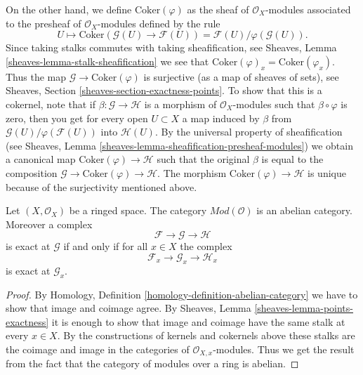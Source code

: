 \medskip\noindent
On the other hand, we define
$\text{Coker}(\varphi)$ as the sheaf of $\mathcal{O}_X$-modules
associated to the presheaf of $\mathcal{O}_X$-modules defined
by the rule
$$
U
\longmapsto
\text{Coker}(\mathcal{G}(U)\to \mathcal{F}(U)) =
\mathcal{F}(U)/\varphi(\mathcal{G}(U)).
$$
Since taking stalks commutes with taking sheafification, see
Sheaves, Lemma \ref{sheaves-lemma-stalk-sheafification} we
see that $\text{Coker}(\varphi)_x = \text{Coker}(\varphi_x)$.
Thus the map $\mathcal{G} \to \text{Coker}(\varphi)$ is surjective
(as a map of sheaves of sets),
see Sheaves, Section \ref{sheaves-section-exactness-points}.
To show that this is a cokernel, note that if
$\beta : \mathcal{G} \to \mathcal{H}$ is a morphism of $\mathcal{O}_X$-modules
such that $\beta \circ \varphi$ is zero, then you get for every
open $U \subset X$ a map induced by $\beta$ from
$\mathcal{G}(U)/\varphi(\mathcal{F}(U))$ into $\mathcal{H}(U)$.
By the universal property of sheafification (see
Sheaves, Lemma \ref{sheaves-lemma-sheafification-presheaf-modules})
we obtain a canonical map $\text{Coker}(\varphi) \to \mathcal{H}$
such that the original $\beta$ is equal to
the composition
$\mathcal{G} \to \text{Coker}(\varphi) \to \mathcal{H}$.
The morphism $\text{Coker}(\varphi) \to \mathcal{H}$ is unique
because of the surjectivity mentioned above.

\begin{lemma}
\label{lemma-abelian}
Let $(X, \mathcal{O}_X)$ be a ringed space. The category
$\textit{Mod}(\mathcal{O})$ is an abelian category. Moreover
a complex
$$
\mathcal{F} \to \mathcal{G} \to \mathcal{H}
$$
is exact at $\mathcal{G}$ if and only if for all $x \in X$ the
complex
$$
\mathcal{F}_x \to \mathcal{G}_x \to \mathcal{H}_x
$$
is exact at $\mathcal{G}_x$.
\end{lemma}

\begin{proof}
By Homology, Definition \ref{homology-definition-abelian-category}
we have to show that image and coimage agree. By Sheaves,
Lemma \ref{sheaves-lemma-points-exactness} it is enough to show
that image and coimage have the same stalk at every $x \in X$.
By the constructions of kernels and cokernels above these stalks
are the coimage and image in the categories of $\mathcal{O}_{X, x}$-modules.
Thus we get the result from the fact that the category of modules
over a ring is abelian.
\end{proof}

